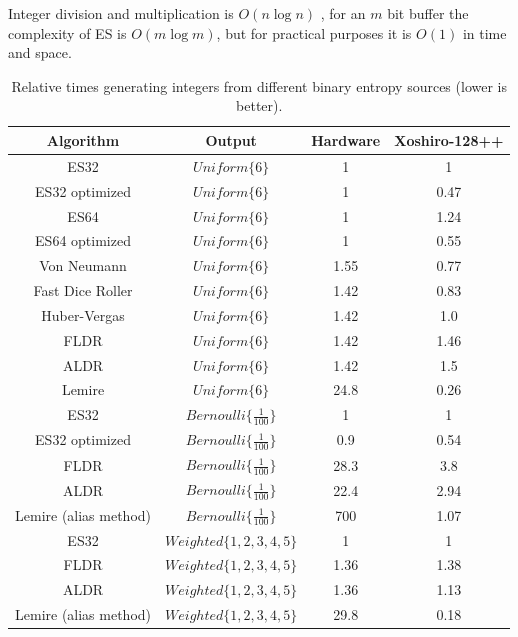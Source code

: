 \documentclass[12pt]{article}
\begin{document}
Integer division and multiplication is $O(n \log n)$ \cite{harvey2021integer}, for an $m$ bit buffer the complexity of ES is $O(m \log m)$, but for practical purposes it is $O(1)$ in time and space.

\begin{table}[h!]
\centering
\begin{tabular}{|c|c|c|c|}
\hline
Algorithm & Output & Hardware & Xoshiro-128++ \\
\hline
ES32                  & $Uniform\{6\}$ & 1 & 1 \\
ES32 optimized        & $Uniform\{6\}$ & 1 & 0.47 \\
ES64                  & $Uniform\{6\}$ & 1 & 1.24 \\
ES64 optimized        & $Uniform\{6\}$ & 1 & 0.55 \\
Von Neumann \cite{neumann51}     & $Uniform\{6\}$ & 1.55 & 0.77 \\
Fast Dice Roller \cite{lumbroso2013optimal} & $Uniform\{6\}$ & 1.42 & 0.83 \\
Huber-Vergas \cite{huber2024optimalrollingfairdice} & $Uniform\{6\}$ & 1.42 & 1.0 \\
FLDR \cite{saad2020fldr} & $Uniform\{6\}$ & 1.42 & 1.46 \\
ALDR \cite{saad2025} & $Uniform\{6\}$ & 1.42 & 1.5 \\
Lemire \cite{lemire2019fast} & $Uniform\{6\}$ & 24.8 & 0.26 \\
\hline

ES32                  & $Bernoulli\{\frac{1}{100}\}$ & 1 & 1 \\
ES32 optimized        & $Bernoulli\{\frac{1}{100}\}$ & 0.9 & 0.54 \\
FLDR                  & $Bernoulli\{\frac{1}{100}\}$ & 28.3 & 3.8 \\
ALDR                  & $Bernoulli\{\frac{1}{100}\}$ & 22.4 & 2.94 \\
Lemire (alias method) & $Bernoulli\{\frac{1}{100}\}$ & 700 & 1.07 \\

\hline

ES32                  & $Weighted\{1,2,3,4,5\}$ & 1 & 1 \\
FLDR                  & $Weighted\{1,2,3,4,5\}$ & 1.36 & 1.38 \\
ALDR                  & $Weighted\{1,2,3,4,5\}$ & 1.36 & 1.13 \\
Lemire (alias method) & $Weighted\{1,2,3,4,5\}$ & 29.8 & 0.18 \\

\hline

\end{tabular}
\caption{Relative times generating integers from different binary entropy sources (lower is better).}
    \label{tab:speed}
\end{table}
\end{document}
